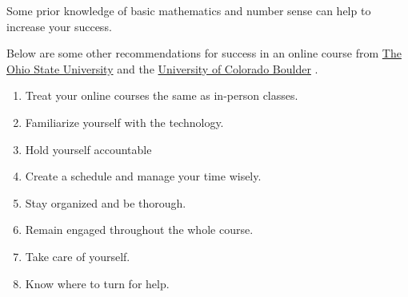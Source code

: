 \documentclass{article}
\begin{document}
Some prior knowledge of basic mathematics and number sense can help to increase your success.

Below are some other recommendations for success in an online course from \href{https://online.osu.edu/resources/learn/5-online-learning-tips-student-success}{The Ohio State University} and the \href{https://www.colorado.edu/health/tips-succeeding-online-classes}{University of Colorado Boulder} .

\begin{enumerate}
\item Treat your online courses the same as in-person classes.
\item Familiarize yourself with the technology.
\item Hold yourself accountable
\item Create a schedule and manage your time wisely.
\item Stay organized and be thorough.
\item Remain engaged throughout the whole course.
\item Take care of yourself.
\item Know where to turn for help.
\end{enumerate}
\end{document}
